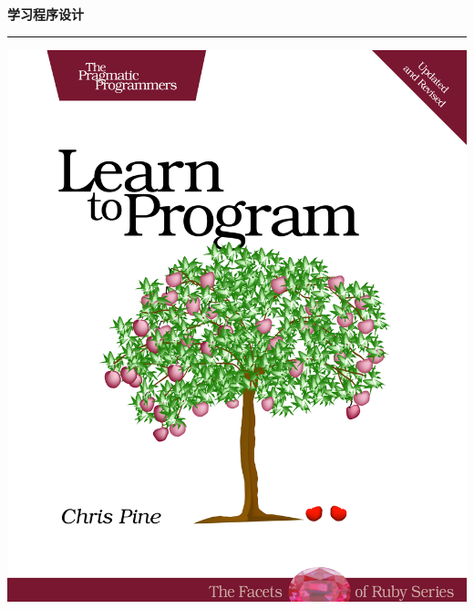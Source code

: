 \documentclass[a4paper, 12pt, openany]{book}
\begin{document}
\setlength{\parindent}{2em}                    


\begin{titlepage}
\vspace*{4ex}
  \begin{flushright}
    \Huge\textbf{学习程序设计}
  \end{flushright}
  \rule{\textwidth}{.2ex}
  \hspace{2em}\includegraphics[scale=0.9]{cover}
\end{titlepage}
\newpage



\tableofcontents
\newpage






\end{document}
